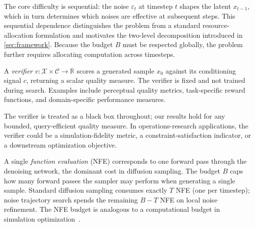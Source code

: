 The core difficulty is sequential: the noise $\varepsilon_t$ at timestep $t$
shapes the latent $x_{t-1}$, which in turn determines which noises are
effective at subsequent steps.
This sequential dependence distinguishes the problem from a standard
resource-allocation formulation and motivates the two-level decomposition
introduced in \cref{sec:framework}.
Because the budget $B$ must be respected globally, the problem further requires
allocating computation across timesteps.

\begin{definition}[Verifier]
\label{def:verifier}
A \emph{verifier} $v : \mathcal{X} \times \mathcal{C} \to \mathbb{R}$ scores a
generated sample $x_0$ against its conditioning signal $c$, returning a scalar
quality measure.
The verifier is fixed and not trained during search.
Examples include perceptual quality metrics, task-specific reward functions,
and domain-specific performance measures.
\end{definition}

\begin{remark}
The verifier is treated as a black box throughout; our results hold
for any bounded, query-efficient quality measure.
In operations-research applications, the verifier could be a
simulation-fidelity metric, a constraint-satisfaction indicator, or a
downstream optimization objective.
\end{remark}

\begin{definition}
\label{def:nfe}
A single \emph{function evaluation} (NFE) corresponds to one forward pass
through the denoising network, the dominant cost in diffusion sampling.
The budget $B$ caps how many forward passes the sampler may
perform when generating a single sample.
Standard diffusion sampling consumes exactly $T$ NFE (one per timestep);
noise trajectory search spends the remaining $B - T$ NFE on local noise
refinement.
The NFE budget is analogous to a computational budget in simulation
optimization~\citep{chen2000simulation}.
\end{definition}
